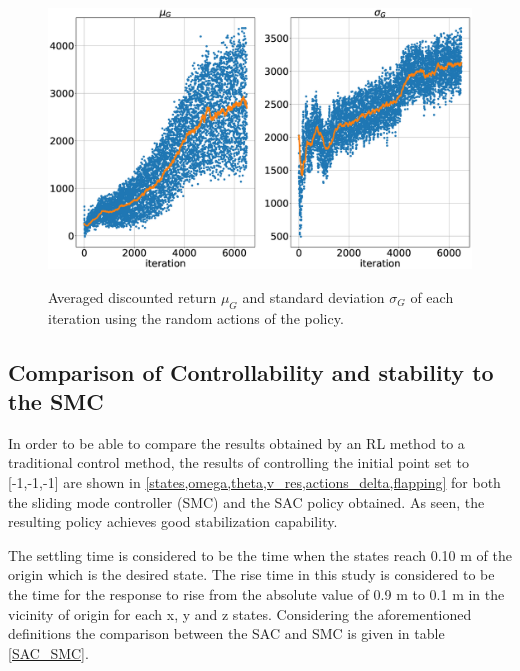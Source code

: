 \begin{figure}
	\begin{center}
		\hbox{\hspace*{-2.5cm} \includegraphics[scale=0.31]{avereturn.eps}}

		\caption{Averaged discounted return $\mu_G$ and standard deviation $\sigma_G$ of each iteration using the random actions of the policy.}
		\label{ave_return}
	\end{center}
\end{figure}

\subsection{Comparison of Controllability and stability to the SMC}

In order to be able to compare the results obtained by an RL method to a traditional control method, the results of controlling the initial point set to [-1,-1,-1] are shown in \cref{states,omega,theta,v_res,actions_delta,flapping} for both the sliding mode controller (SMC) and the SAC policy obtained. As seen, the resulting policy achieves good stabilization capability.

The settling time is considered to be the time when the states reach 0.10 m of the origin which is the desired state. The rise time in this study is considered to be the time for the response to rise from the absolute value of 0.9 m to 0.1 m in the vicinity of origin for each x, y and z states. Considering the aforementioned definitions the comparison between the SAC and SMC is given in table \ref{SAC_SMC}.

